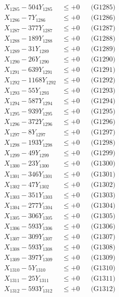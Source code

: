 \documentclass[a4paper,10pt]{article}
\begin{document}
{\begin{align}
X_{1285} - 504Y_{1285} &\leq +0 && \text{(G1285)} \\
X_{1286} - 7Y_{1286} &\leq +0 && \text{(G1286)} \\
X_{1287} - 377Y_{1287} &\leq +0 && \text{(G1287)} \\
X_{1288} - 189Y_{1288} &\leq +0 && \text{(G1288)} \\
X_{1289} - 31Y_{1289} &\leq +0 && \text{(G1289)} \\
X_{1290} - 26Y_{1290} &\leq +0 && \text{(G1290)} \\
\allowbreak
X_{1291} - 639Y_{1291} &\leq +0 && \text{(G1291)} \\
X_{1292} - 1168Y_{1292} &\leq +0 && \text{(G1292)} \\
X_{1293} - 55Y_{1293} &\leq +0 && \text{(G1293)} \\
X_{1294} - 587Y_{1294} &\leq +0 && \text{(G1294)} \\
X_{1295} - 939Y_{1295} &\leq +0 && \text{(G1295)} \\
X_{1296} - 372Y_{1296} &\leq +0 && \text{(G1296)} \\
X_{1297} - 8Y_{1297} &\leq +0 && \text{(G1297)} \\
X_{1298} - 193Y_{1298} &\leq +0 && \text{(G1298)} \\
X_{1299} - 49Y_{1299} &\leq +0 && \text{(G1299)} \\
X_{1300} - 23Y_{1300} &\leq +0 && \text{(G1300)} \\
\allowbreak
X_{1301} - 346Y_{1301} &\leq +0 && \text{(G1301)} \\
X_{1302} - 47Y_{1302} &\leq +0 && \text{(G1302)} \\
X_{1303} - 351Y_{1303} &\leq +0 && \text{(G1303)} \\
X_{1304} - 277Y_{1304} &\leq +0 && \text{(G1304)} \\
X_{1305} - 306Y_{1305} &\leq +0 && \text{(G1305)} \\
X_{1306} - 593Y_{1306} &\leq +0 && \text{(G1306)} \\
X_{1307} - 309Y_{1307} &\leq +0 && \text{(G1307)} \\
X_{1308} - 593Y_{1308} &\leq +0 && \text{(G1308)} \\
X_{1309} - 397Y_{1309} &\leq +0 && \text{(G1309)} \\
X_{1310} - 5Y_{1310} &\leq +0 && \text{(G1310)} \\
\allowbreak
X_{1311} - 25Y_{1311} &\leq +0 && \text{(G1311)} \\
X_{1312} - 593Y_{1312} &\leq +0 && \text{(G1312)} \\

\end{align}}
\end{document}

